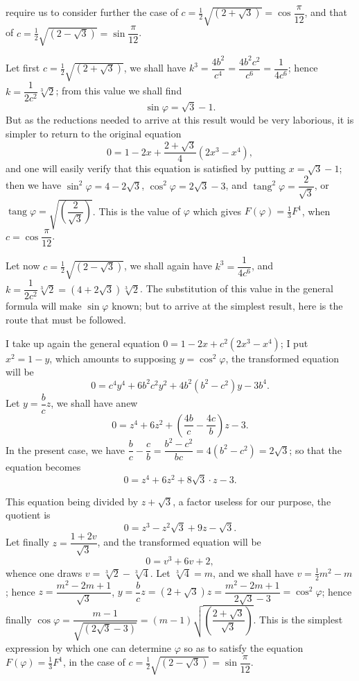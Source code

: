 \documentclass{article}
\begin{document}
require us to consider further the case of $c=\frac{1}{2}\sqrt{(2+\sqrt{3})}=\cos\dfrac{\pi}{12}$, and that of $c=\frac{1}{2}\sqrt{(2-\sqrt{3})}=\sin\dfrac{\pi}{12}$.

Let first $c=\frac{1}{2}\sqrt{(2+\sqrt{3})}$, we shall have $k^{3}=\dfrac{4b^{2}}{c^{4}}=\dfrac{4b^{2}c^{2}}{c^{6}}=\dfrac{1}{4c^{6}}$; hence $k=\dfrac{1}{2c^{2}}\sqrt[3]{2}$; from this value we shall find
\[ \sin\varphi=\sqrt{3}-1. \]
But as the reductions needed to arrive at this result would be very laborious, it is simpler to return to the original equation
\[ 0=1-2x+\frac{2+\sqrt{3}}{4}(2x^{3}-x^{4}), \]
and one will easily verify that this equation is satisfied by putting $x=\sqrt{3}-1$; then we have $\sin^{2}\varphi=4-2\sqrt{3}$, $\cos^{2}\varphi=2\sqrt{3}-3$, and $\operatorname{tang}^{2}\varphi=\dfrac{2}{\sqrt{3}}$, or $\operatorname{tang}\varphi=\sqrt{\left(\dfrac{2}{\sqrt{3}}\right)}$. This is the value of $\varphi$ which gives $F(\varphi)=\frac{1}{3}F^{1}$, when $c=\cos\dfrac{\pi}{12}$.

Let now $c=\frac{1}{2}\sqrt{(2-\sqrt{3})}$, we shall again have $k^{3}=\dfrac{1}{4c^{6}}$, and $k=\dfrac{1}{2c^{2}}\sqrt[3]{2}=(4+2\sqrt{3})\sqrt[3]{2}$.
The substitution of this value in the general formula will make $\sin\varphi$ known; but to arrive at the simplest result, here is the route that must be followed.

I take up again the general equation $0=1-2x+c^{2}(2x^{3}-x^{4})$; I put $x^{2}=1-y$, which amounts to supposing $y=\cos^{2}\varphi$, the transformed equation will be
\[ 0=c^{4}y^{4}+6b^{2}c^{2}y^{2}+4b^{2}(b^{2}-c^{2})y-3b^{4}. \]
Let $y=\dfrac{b}{c}z$, we shall have anew
\[ 0=z^{4}+6z^{2}+\left(\frac{4b}{c}-\frac{4c}{b}\right)z-3. \]
In the present case, we have $\dfrac{b}{c}-\dfrac{c}{b}=\dfrac{b^{2}-c^{2}}{bc}=4(b^{2}-c^{2})=2\sqrt{3}$; so that the equation becomes
\[ 0=z^{4}+6z^{2}+8\sqrt{3}\cdot z-3. \]

This equation being divided by $z+\sqrt{3}$, a factor useless for our purpose, the quotient is
\[ 0=z^{3}-z^{2}\sqrt{3}+9z-\sqrt{3}. \]
Let finally $z=\dfrac{1+2v}{\sqrt{3}}$, and the transformed equation will be
\[ 0=v^{3}+6v+2, \]
whence one draws $v=\sqrt[3]{2}-\sqrt[3]{4}$. Let $\sqrt[3]{4}=m$, and we shall have $v=\frac{1}{2}m^{2}-m$; hence $z=\dfrac{m^{2}-2m+1}{\sqrt{3}}$, $y=\dfrac{b}{c}z=(2+\sqrt{3})z=\dfrac{m^{2}-2m+1}{2\sqrt{3}-3}=\cos^{2}\varphi$; hence finally $\cos\varphi=\dfrac{m-1}{\sqrt{(2\sqrt{3}-3)}}=(m-1)\sqrt{\left(\dfrac{2+\sqrt{3}}{\sqrt{3}}\right)}$. This is the simplest expression by which one can determine $\varphi$ so as to satisfy the equation $F(\varphi)=\frac{1}{3}F^{1}$, in the case of $c=\frac{1}{2}\sqrt{(2-\sqrt{3})}=\sin\dfrac{\pi}{12}$.
\end{document}
